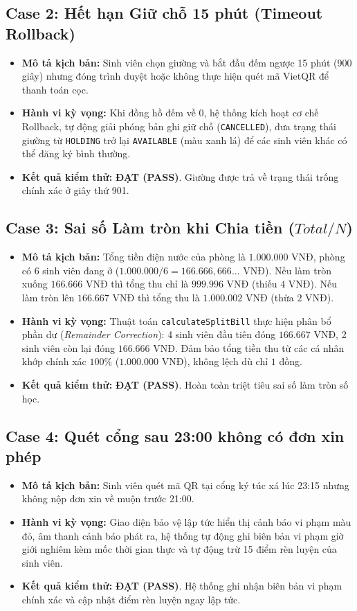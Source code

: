 \subsection{Case 2: Hết hạn Giữ chỗ 15 phút (Timeout Rollback)}
\begin{itemize}
    \item \textbf{Mô tả kịch bản:} Sinh viên chọn giường và bắt đầu đếm ngược 15 phút (900 giây) nhưng đóng trình duyệt hoặc không thực hiện quét mã VietQR để thanh toán cọc.
    \item \textbf{Hành vi kỳ vọng:} Khi đồng hồ đếm về 0, hệ thống kích hoạt cơ chế Rollback, tự động giải phóng bản ghi giữ chỗ (\texttt{CANCELLED}), đưa trạng thái giường từ \texttt{HOLDING} trở lại \texttt{AVAILABLE} (màu xanh lá) để các sinh viên khác có thể đăng ký bình thường.
    \item \textbf{Kết quả kiểm thử:} \textbf{\color{green!70!black}ĐẠT (PASS)}. Giường được trả về trạng thái trống chính xác ở giây thứ 901.
\end{itemize}

\subsection{Case 3: Sai số Làm tròn khi Chia tiền ($Total / N$)}
\begin{itemize}
    \item \textbf{Mô tả kịch bản:} Tổng tiền điện nước của phòng là $1.000.000$ VNĐ, phòng có 6 sinh viên đang ở ($1.000.000 / 6 = 166.666,666...$ VNĐ). Nếu làm tròn xuống $166.666$ VNĐ thì tổng thu chỉ là $999.996$ VNĐ (thiếu $4$ VNĐ). Nếu làm tròn lên $166.667$ VNĐ thì tổng thu là $1.000.002$ VNĐ (thừa $2$ VNĐ).
    \item \textbf{Hành vi kỳ vọng:} Thuật toán \texttt{calculateSplitBill} thực hiện phân bổ phần dư (\textit{Remainder Correction}): 4 sinh viên đầu tiên đóng $166.667$ VNĐ, 2 sinh viên còn lại đóng $166.666$ VNĐ. Đảm bảo tổng tiền thu từ các cá nhân khớp chính xác $100\%$ ($1.000.000$ VNĐ), không lệch dù chỉ $1$ đồng.
    \item \textbf{Kết quả kiểm thử:} \textbf{\color{green!70!black}ĐẠT (PASS)}. Hoàn toàn triệt tiêu sai số làm tròn số học.
\end{itemize}

\subsection{Case 4: Quét cổng sau 23:00 không có đơn xin phép}
\begin{itemize}
    \item \textbf{Mô tả kịch bản:} Sinh viên quét mã QR tại cổng ký túc xá lúc 23:15 nhưng không nộp đơn xin về muộn trước 21:00.
    \item \textbf{Hành vi kỳ vọng:} Giao diện bảo vệ lập tức hiển thị cảnh báo vi phạm màu đỏ, âm thanh cảnh báo phát ra, hệ thống tự động ghi biên bản vi phạm giờ giới nghiêm kèm mốc thời gian thực và tự động trừ 15 điểm rèn luyện của sinh viên.
    \item \textbf{Kết quả kiểm thử:} \textbf{\color{green!70!black}ĐẠT (PASS)}. Hệ thống ghi nhận biên bản vi phạm chính xác và cập nhật điểm rèn luyện ngay lập tức.
\end{itemize}


